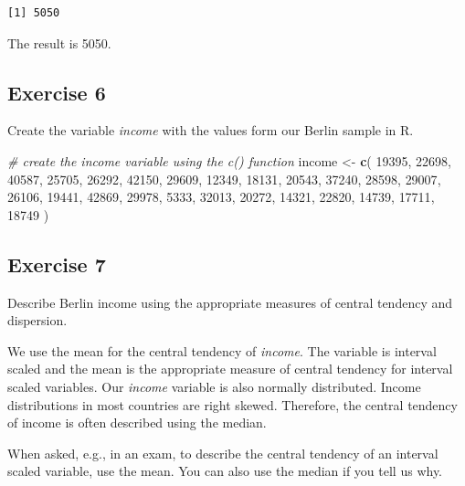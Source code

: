 \documentclass[]{book}
\newenvironment{Shaded}{\begin{snugshade}}{\end{snugshade}}
\newcommand{\KeywordTok}[1]{\textcolor[rgb]{0.13,0.29,0.53}{\textbf{#1}}}
\newcommand{\DecValTok}[1]{\textcolor[rgb]{0.00,0.00,0.81}{#1}}
\newcommand{\StringTok}[1]{\textcolor[rgb]{0.31,0.60,0.02}{#1}}
\newcommand{\CommentTok}[1]{\textcolor[rgb]{0.56,0.35,0.01}{\textit{#1}}}
\newcommand{\NormalTok}[1]{#1}
\theoremstyle{definition}
\theoremstyle{definition}
\theoremstyle{definition}
\theoremstyle{remark}
\begin{document}
\begin{verbatim}
[1] 5050
\end{verbatim}

The result is 5050.

\subsection{Exercise 6}\label{exercise-6}

Create the variable \emph{income} with the values form our Berlin sample
in R.

\begin{Shaded}
\begin{Highlighting}[]
\CommentTok{# create the income variable using the c() function}
\NormalTok{income <-}\StringTok{ }\KeywordTok{c}\NormalTok{(}
  \DecValTok{19395}\NormalTok{, }\DecValTok{22698}\NormalTok{, }\DecValTok{40587}\NormalTok{, }\DecValTok{25705}\NormalTok{, }\DecValTok{26292}\NormalTok{, }\DecValTok{42150}\NormalTok{, }\DecValTok{29609}\NormalTok{, }\DecValTok{12349}\NormalTok{, }\DecValTok{18131}\NormalTok{, }
  \DecValTok{20543}\NormalTok{, }\DecValTok{37240}\NormalTok{, }\DecValTok{28598}\NormalTok{, }\DecValTok{29007}\NormalTok{, }\DecValTok{26106}\NormalTok{, }\DecValTok{19441}\NormalTok{, }\DecValTok{42869}\NormalTok{, }\DecValTok{29978}\NormalTok{, }\DecValTok{5333}\NormalTok{, }
  \DecValTok{32013}\NormalTok{, }\DecValTok{20272}\NormalTok{, }\DecValTok{14321}\NormalTok{, }\DecValTok{22820}\NormalTok{, }\DecValTok{14739}\NormalTok{, }\DecValTok{17711}\NormalTok{, }\DecValTok{18749}
\NormalTok{)}
\end{Highlighting}
\end{Shaded}

\subsection{Exercise 7}\label{exercise-7}

Describe Berlin income using the appropriate measures of central
tendency and dispersion.

We use the mean for the central tendency of \emph{income}. The variable
is interval scaled and the mean is the appropriate measure of central
tendency for interval scaled variables. Our \emph{income} variable is
also normally distributed. Income distributions in most countries are
right skewed. Therefore, the central tendency of income is often
described using the median.

When asked, e.g., in an exam, to describe the central tendency of an
interval scaled variable, use the mean. You can also use the median if
you tell us why.
\end{document}
